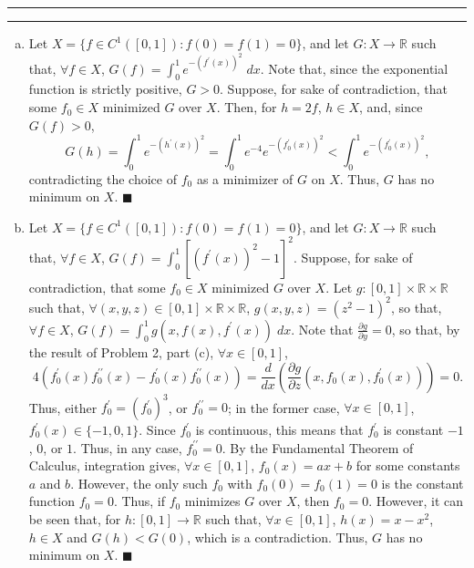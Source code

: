 \documentclass[11pt]{article}
\newcounter{questionCounter}
\newcounter{partCounter}[questionCounter]
\newenvironment{question}[2][\arabic{questionCounter}]{%
    \setcounter{partCounter}{0}%
    \vspace{.25in} \hrule \vspace{0.5em}%
        \noindent{\bf #2}%
    \vspace{0.8em} \hrule \vspace{.10in}%
    \addtocounter{questionCounter}{1}%
}{}
\begin{document}
\begin{question}{Problem 3}
\begin{enumerate}[(a)]
\item Let $X = \{f \in C^1([0,1]) : f(0) = f(1) = 0\}$, and let
$G : X \rightarrow \mathbb{R}$ such that, $\forall f \in X$,
$G(f) = \int_0^1 e^{-(f^{\prime}(x))^2} \; dx$. Note that, since the
exponential function is strictly positive, $G > 0$. Suppose, for sake of
contradiction, that some $f_0 \in X$ minimized $G$ over $X$. Then, for
$h = 2f$, $h \in X$, and, since $G(f) > 0$,
\[G(h) = \int_0^1 e^{-(h^{\prime}(x))^2}
       = \int_0^1 e^{-4}e^{-(f_0^{\prime}(x))^2}
       < \int_0^1 e^{-(f_0^{\prime}(x))^2},\]
contradicting the choice of $f_0$ as a minimizer of $G$ on $X$. Thus, $G$ has
no minimum on $X$. \qquad $\blacksquare$

\item Let $X = \{f \in C^1([0,1]) : f(0) = f(1) = 0\}$, and let
$G : X \rightarrow \mathbb{R}$ such that, $\forall f \in X$,
$G(f) = \int_0^1 \left[(f^{\prime}(x))^2 - 1\right]^2$. Suppose, for sake of
contradiction, that some $f_0 \in X$ minimized $G$ over $X$. Let
$g : [0,1] \times \mathbb{R} \times \mathbb{R}$ such that,
$\forall (x,y,z) \in [0,1] \times \mathbb{R} \times \mathbb{R}$,
$g(x,y,z) = (z^2 - 1)^2$, so that, $\forall f \in X$,
$G(f) = \int_0^1 g(x,f(x),f^{\prime}(x)) \; dx$. Note that
$\frac{\partial g}{\partial y} = 0$, so that, by the result of Problem 2, part
(c), $\forall x \in [0,1]$,
\[4(f_0^{\prime}(x)f_0^{\prime\prime}(x) - f_0^{\prime}(x)f_0^{\prime\prime}(x))
 = \frac{d}{dx} \left(
  \frac{\partial g}{\partial z} (x,f_0(x),f_0^{\prime}(x))\right) = 0.\]
Thus, either $f_0^{\prime} = (f_0^{\prime})^3$, or $f_0^{\prime\prime} = 0$;
in the former case, $\forall x \in [0,1]$, $f_0^{\prime}(x) \in \{-1,0,1\}$.
Since $f_0^{\prime}$ is continuous, this means that $f_0^{\prime}$ is constant
$-1$, $0$, or $1$. Thus, in any case, $f_0^{\prime\prime} = 0$. By the
Fundamental Theorem of Calculus, integration gives, $\forall x \in [0,1]$,
$f_0(x) = ax + b$ for some constants $a$ and $b$. However, the only such $f_0$
with $f_0(0) = f_0(1) = 0$ is the constant function $f_0 = 0$. Thus, if $f_0$
minimizes $G$ over $X$, then $f_0 = 0$. However, it can be seen that, for
$h : [0,1] \rightarrow \mathbb{R}$ such that, $\forall x \in [0,1]$,
$h(x) = x - x^2$, $h \in X$ and $G(h) < G(0)$, which is a contradiction. Thus,
$G$ has no minimum on $X$. \qquad $\blacksquare$


\end{enumerate}
\end{question}
\end{document}
